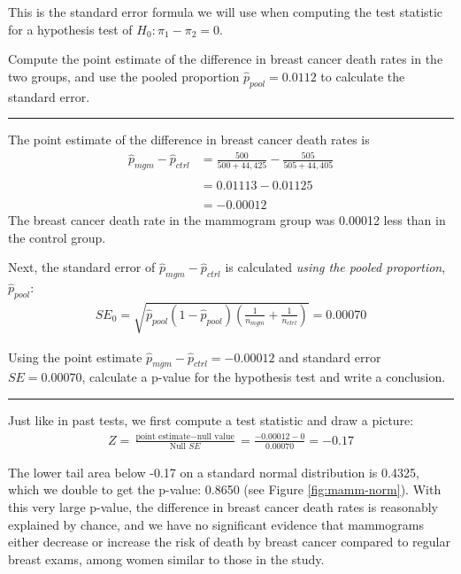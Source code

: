 \documentclass[
  10pt,
  openany]{book}
\theoremstyle{definition}
\theoremstyle{definition}
\theoremstyle{definition}
\theoremstyle{definition}
\theoremstyle{remark}
\begin{document}
This is the standard error formula we will use when computing the test statistic for a hypothesis test of \(H_0: \pi_1 - \pi_2 = 0\).

Compute the point estimate of the difference in breast cancer death rates in the two groups, and use the pooled proportion \(\hat{p}_{\textit{pool}} = 0.0112\) to calculate the standard error.

\begin{center}\rule{0.5\linewidth}{0.5pt}\end{center}

The point estimate of the difference in breast cancer death rates is \begin{align*}
  \hat{p}_{mgm} - \hat{p}_{ctrl}
    &= \frac{500}{500 + 44,425} - \frac{505}{505 + 44,405} \\
  & \\
    &= 0.01113 - 0.01125 \\
  & \\
    &= -0.00012
  \end{align*} The breast cancer death rate in the mammogram group was 0.00012 less than in the control group.

Next, the standard error of \(\hat{p}_{mgm} - \hat{p}_{ctrl}\) is calculated \emph{using the pooled proportion}, \(\hat{p}_{\textit{pool}}\): \begin{align*}
SE_0 = \sqrt{\hat{p}_{\textit{pool}}(1-\hat{p}_{\textit{pool}}) \left(\frac{1}{n_{mgm}} + \frac{1}{n_{ctrl}} \right)}= 0.00070
\end{align*}

Using the point estimate \(\hat{p}_{mgm} - \hat{p}_{ctrl} = -0.00012\) and standard error \(SE = 0.00070\), calculate a p-value for the hypothesis test and write a conclusion.

\begin{center}\rule{0.5\linewidth}{0.5pt}\end{center}

Just like in past tests, we first compute a test statistic and draw a picture: \begin{align*}
Z = \frac{\text{point estimate} - \text{null value}}{\mbox{Null }SE}
    = \frac{-0.00012 - 0}{0.00070}
    = -0.17
\end{align*}

The lower tail area below -0.17 on a standard normal distribution is 0.4325, which we double to get the p-value: 0.8650 (see Figure \ref{fig:mamm-norm}). With this very large p-value, the difference in breast cancer death rates is reasonably explained by chance, and we have no significant evidence that mammograms either decrease or increase the risk of death by breast cancer compared to regular breast exams, among women similar to those in the study.
\end{document}
